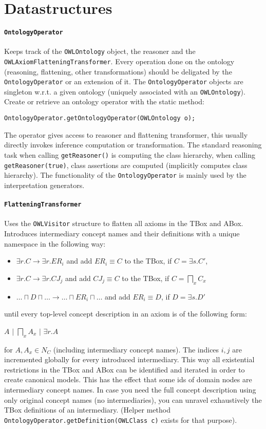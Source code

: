 \documentclass{article}
\begin{document}
\section{Datastructures}

\paragraph{\texttt{OntologyOperator}}
Keeps track of the \texttt{OWLOntology} object, the reasoner and the
\texttt{OWLAxiomFlatteningTransformer}. Every operation done on the ontology
(reasoning, flattening, other transformations) should be deligated by the
\texttt{OntologyOperator} or an extension of it. The \texttt{OntologyOperator}
objects are singleton w.r.t. a given ontology (uniquely associated with an
\texttt{OWLOntology}). Create or retrieve an ontology operator with the static
method:

\texttt{OntologyOperator.getOntologyOperator(OWLOntology o);}

The operator gives access to reasoner and flattening transformer, this usually
directly invokes inference computation or transformation. The standard reasoning
task when calling \texttt{getReasoner()} is computing the class hierarchy, when
calling \texttt{getReasoner(true)}, class assertions are computed (implicitly
computes class hierarchy). The functionality of the \texttt{OntologyOperator} is
mainly used by the interpretation generators.

\paragraph{\texttt{FlatteningTransformer}} Uses the \texttt{OWLVisitor}
structure to flatten all axioms in the TBox and ABox. Introduces intermediary concept names
and their definitions with a unique namespace in the following way:
\begin{itemize}
  \item $\exists r. C \longrightarrow \exists r. ER_i$ and add $ER_i \equiv C$
  to the TBox, if $C = \exists s.C'$,
  \item $\exists r. C \longrightarrow \exists r. CJ_j$ and add $CJ_j \equiv C$
  to the TBox, if $C = \bigsqcap\limits_x C_x$
  \item $\ldots\sqcap D \sqcap \ldots \longrightarrow \ldots \sqcap ER_i \sqcap
  \ldots$ and add $ER_i \equiv D$, if $D=\exists s.D'$
\end{itemize}
until every top-level concept description in an axiom is of the following form:
\begin{center}
$A$ $|$ $\bigsqcap\limits_x A_x$ $|$ $\exists r.A$
\end{center}
for $A,A_x\in N_C$ (including intermediary concept names). The indices $i,j$
are incremented globally for every introduced intermediary. This way all
existential restrictions in the TBox and ABox can be identified and iterated in
order to create canonical models. This has the effect that some ids of domain
nodes are intermediary concept names. In case you need the full concept
description using only original concept names (no intermediaries), you can
unravel exhaustively the TBox definitions of an intermediary. (Helper method
\texttt{OntologyOperator.getDefinition(OWLClass c)} exists for that purpose).
\end{document}
